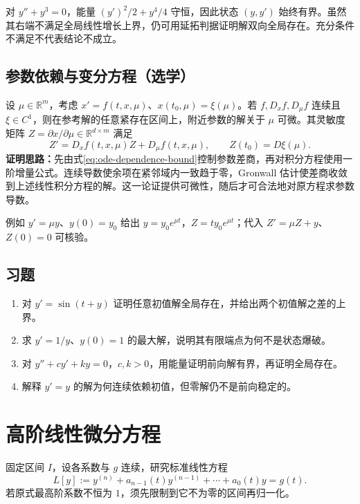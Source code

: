 \documentclass[UTF8,12pt,a4paper,fontset=fandol]{ctexbook}
\begin{document}
\begin{example}
对 $y''+y^3=0$，能量 $(y')^2/2+y^4/4$ 守恒，因此状态 $(y,y')$ 始终有界。虽然其右端不满足全局线性增长上界，仍可用延拓判据证明解双向全局存在。充分条件不满足不代表结论不成立。
\end{example}

\section{参数依赖与变分方程（选学）}
设 $\mu\in\mathbb R^m$，考虑 $x'=f(t,x,\mu)$、$x(t_0,\mu)=\xi(\mu)$。若 $f,D_xf,D_\mu f$ 连续且 $\xi\in C^1$，则在参考解的任意紧存在区间上，附近参数的解关于 $\mu$ 可微。其灵敏度矩阵 $Z=\partial x/\partial\mu\in\mathbb R^{d\times m}$ 满足
\begin{equation}
 Z'=D_xf(t,x,\mu)Z+D_\mu f(t,x,\mu),\qquad Z(t_0)=D\xi(\mu).
 \label{eq:ode-sensitivity}
\end{equation}
\textbf{证明思路：}先由式\eqref{eq:ode-dependence-bound}控制参数差商，再对积分方程使用一阶增量公式。连续导数使余项在紧邻域内一致趋于零，Gronwall 估计使差商收敛到上述线性积分方程的解。这一论证提供可微性，随后才可合法地对原方程求参数导数。

例如 $y'=\mu y$、$y(0)=y_0$ 给出 $y=y_0e^{\mu t}$，$Z=ty_0e^{\mu t}$；代入 $Z'=\mu Z+y$、$Z(0)=0$ 可核验。

\section{习题}
\begin{enumerate}
 \item\label{ex:ode-growth} 对 $y'=\sin(t+y)$ 证明任意初值解全局存在，并给出两个初值解之差的上界。
 \item\label{ex:ode-domain} 求 $y'=1/y$、$y(0)=1$ 的最大解，说明其有限端点为何不是状态爆破。
 \item 对 $y''+cy'+ky=0$，$c,k>0$，用能量证明前向解有界，再证明全局存在。
 \item 解释 $y'=y$ 的解为何连续依赖初值，但零解仍不是前向稳定的。
\end{enumerate}

\chapter{高阶线性微分方程}
\label{chap:ode-linear-scalar}

固定区间 $I$，设各系数与 $g$ 连续，研究标准线性方程
\begin{equation}
 L[y]:=y^{(n)}+a_{n-1}(t)y^{(n-1)}+\cdots+a_0(t)y=g(t).
 \label{eq:ode-linear-standard}
\end{equation}
若原式最高阶系数不恒为 $1$，须先限制到它不为零的区间再归一化。
\end{document}
